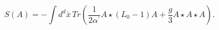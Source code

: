 \begin{equation}
S\left( A\right) =-\int d^{d}\bar{x}\,Tr\left( \frac{1}{2\alpha ^{\prime }}%
A\star (L_{0}-1)A+\frac{g}{3}A\star A\star A\right) .  \label{action}
\end{equation}%
